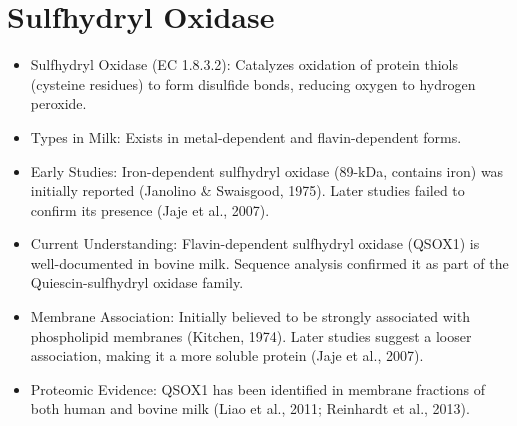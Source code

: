 \section{Sulfhydryl Oxidase}
\begin{itemize}
    \item Sulfhydryl Oxidase (EC 1.8.3.2): Catalyzes oxidation of protein thiols (cysteine residues) to form disulfide bonds, reducing oxygen to hydrogen peroxide.
    \item Types in Milk: Exists in metal-dependent and flavin-dependent forms.
    \item Early Studies:
    \subitem Iron-dependent sulfhydryl oxidase (89-kDa, contains iron) was initially reported (Janolino \& Swaisgood, 1975).
    \subitem Later studies failed to confirm its presence (Jaje et al., 2007).
    \item Current Understanding:
    \subitem Flavin-dependent sulfhydryl oxidase (QSOX1) is well-documented in bovine milk.
    \subitem Sequence analysis confirmed it as part of the Quiescin-sulfhydryl oxidase family.
    \item Membrane Association:
    \subitem Initially believed to be strongly associated with phospholipid membranes (Kitchen, 1974).
    \subitem Later studies suggest a looser association, making it a more soluble protein (Jaje et al., 2007).
    \item Proteomic Evidence: QSOX1 has been identified in membrane fractions of both human and bovine milk (Liao et al., 2011; Reinhardt et al., 2013).
\end{itemize}

